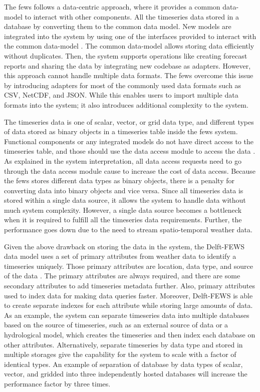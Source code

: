 The \acrshort{fews} follows a data-centric approach, where it provides a common data-model to interact with other components. All the timeseries data stored in a database by converting them to the common data model. New models are integrated into the system by using one of the interfaces provided to interact with the common data-model \cite{Werner2013TheSystem}. The common data-model allows storing data efficiently without duplicates. Then, the system supports operations like creating forecast reports and sharing the data by integrating new codebase as adapters. However, this approach cannot handle multiple data formats. The \acrshort{fews} overcome this issue by introducing adapters for most of the commonly used data formats such as CSV, NetCDF, and JSON. While this enables users to import multiple data formats into the system; it also introduces additional complexity to the system.

The timeseries data is one of scalar, vector, or grid data type, and different types of data stored as binary objects in a timeseries table inside the \acrshort{fews} system. Functional components or any integrated models do not have direct access to the timeseries table, and those should use the data access module to access the data \cite{Werner2013TheSystem}. As explained in the system interpretation, all data access requests need to go through the data access module cause to increase the cost of data access. Because the \acrshort{fews} stores different data types as binary objects, there is a penalty for converting data into binary objects and vice versa. Since all timeseries data is stored within a single data source, it allows the system to handle data without much system complexity. However, a single data source becomes a bottleneck when it is required to fulfill all the timeseries data requirements. Further, the performance goes down due to the need to stream spatio-temporal weather data.

Given the above drawback on storing the data in the system, the Delft-FEWS data model uses a set of primary attributes from weather data to identify a timeseries uniquely. Those primary attributes are location, data type, and source of the data \cite{Werner2013TheSystem}. The primary attributes are always required, and there are some secondary attributes to add timeseries metadata further. Also, primary attributes used to index data for making data queries faster. Moreover, Delft-FEWS is able to create separate indexes for each attribute while storing large amounts of data. As an example, the system can separate timeseries data into multiple databases based on the source of timeseries, such as an external source of data or a hydrological model, which creates the timeseries and then index each database on other attributes. Alternatively, separate timeseries by data type and stored in multiple storages give the capability for the system to scale with a factor of identical types. An example of separation of database by data types of scalar, vector, and gridded into three independently hosted databases will increase the performance factor by three times.


